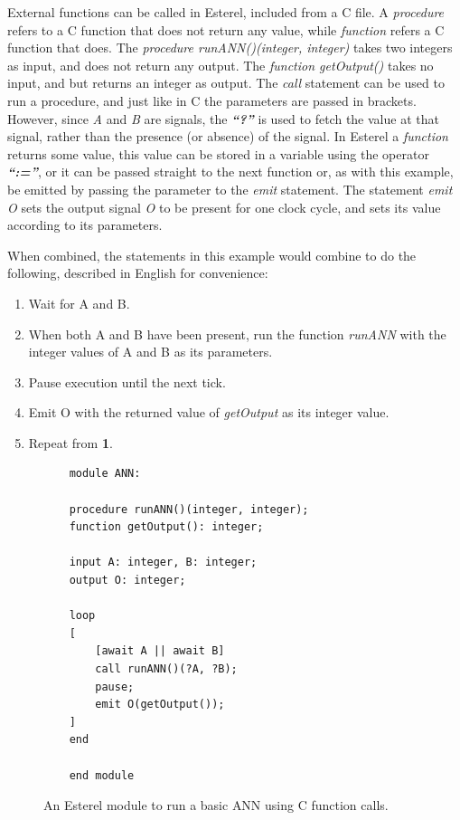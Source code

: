 External functions can be called in Esterel, included from a C file.
A \textit{procedure} refers to a C function that does not return any value, while \textit{function} refers a C function that does.
The \textit{procedure runANN()(integer, integer)} takes two integers as input, and does not return any output.
The \textit{function getOutput()} takes no input, and but returns an integer as output.
The \textit{call} statement can be used to run a procedure, and just like in C the parameters are passed in brackets.
However, since \textit{A} and \textit{B} are signals, the \textbf{\emph{``?''}} is used to fetch the value at that signal, rather than the presence (or absence) of the signal.
In Esterel a \textit{function} returns some value, this value can be stored in a variable using the operator \textbf{\emph{``:=''}}, or it can be passed straight to the next function or, as with this example, be emitted by passing the parameter to the \textit{emit} statement.
The statement \textit{emit O} sets the output signal \textit{O} to be present for one clock cycle, and sets its value according to its parameters.

When combined, the statements in this example would combine to do the following, described in English for convenience:
\begin{enumerate}
	\item Wait for A and B. 
	\item When both A and B have been present, run the function \textit{runANN} with the integer values of A and B as its parameters.
	\item Pause execution until the next tick.
	\item Emit O with the returned value of \textit{getOutput} as its integer value.
	\item Repeat from \textbf{1}.
\end{enumerate}

\begin{figure}
	\begin{lstlisting}
	module ANN:
	
	procedure runANN()(integer, integer);
	function getOutput(): integer;
	
	input A: integer, B: integer;
	output O: integer;
	
	loop
	[
		[await A || await B] 
		call runANN()(?A, ?B);
		pause;
		emit O(getOutput());
	]
	end
	
	end module
	\end{lstlisting}
	\caption{An Esterel module to run a basic \ac{ANN} using C function calls.}
	\label{fig:esterel-abro}
\end{figure}


